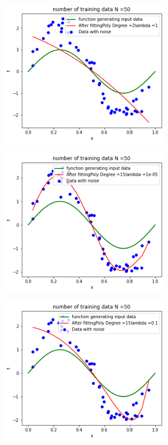 \documentclass[journal,12pt,twocolumn]{IEEEtran}
\begin{document}
\begin{figure}[!h]
\begin{center}
\includegraphics[width=3.4in]{figs/fig3.png}
\end{center}
\caption{}
\label{fig:3}
\end{figure}

\begin{figure}[!h]
\begin{center}
\includegraphics[width=3.4in]{figs/fig4.png}
\end{center}
\caption{}
\label{fig:4}
\end{figure}

\begin{figure}[!h]
\begin{center}
\includegraphics[width=3.4in]{figs/fig5.png}
\end{center}
\caption{}
\label{fig:5}
\end{figure}
\end{document}
